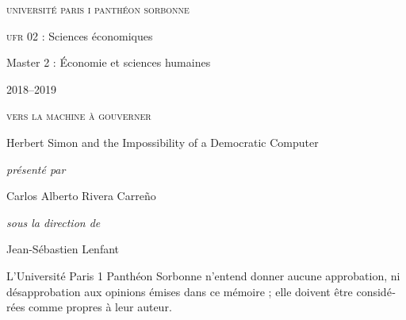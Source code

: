 \begin{titlepage}
 \centering
\begin{french}
 {\large \textsc{université paris i panthéon sorbonne} \par}
  \vspace*{0.01\textheight}
 {\large \textsc{ufr} 02 : Sciences économiques  \par}
  \vspace*{0.01\textheight}
 {\large Master 2 : Économie et sciences humaines \par}
  \vspace*{0.01\textheight}
 {\large 2018--2019 \par}
\end{french}
  \vspace*{0.3\textheight}
 {\huge \textsc{vers la machine à gouverner}  \par}
  \vspace*{0.02\textheight}
 {\Large Herbert Simon and the Impossibility of a Democratic Computer \par}
\vfill
\begin{french}
 {\large\itshape présenté par  \par}
\end{french}
 {\Large Carlos Alberto Rivera Carreño \par}
  \vspace*{0.05\textheight}
\begin{french}
 {\large\itshape sous la direction de \par}
\end{french}
 {\Large Jean-Sébastien Lenfant \par}
\end{titlepage}

\pagestyle{empty}

\begin{french}
L'Université Paris 1 Panthéon Sorbonne n'entend donner aucune approbation,
ni désapprobation aux opinions émises dans ce mémoire ; elle doivent être
considérées comme propres à leur auteur. 
\end{french}
\vfill

